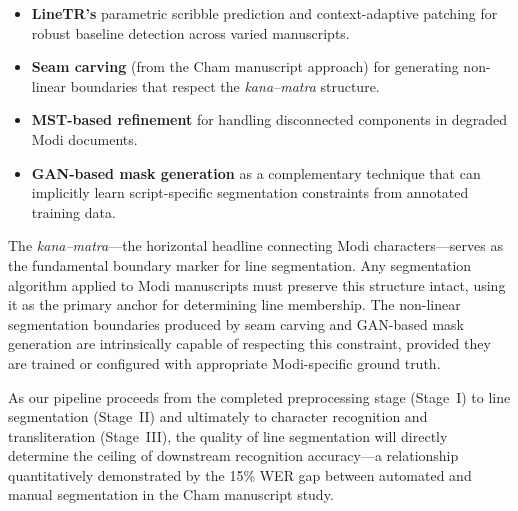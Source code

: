 \documentclass[11pt, a4paper]{article}
\begin{document}
\begin{itemize}[leftmargin=1.5em]
    \item \textbf{LineTR's} parametric scribble prediction and context-adaptive patching for robust baseline detection across varied manuscripts.
    \item \textbf{Seam carving} (from the Cham manuscript approach) for generating non-linear boundaries that respect the \textit{kana--matra} structure.
    \item \textbf{MST-based refinement} for handling disconnected components in degraded Modi documents.
    \item \textbf{GAN-based mask generation} as a complementary technique that can implicitly learn script-specific segmentation constraints from annotated training data.
\end{itemize}

The \textit{kana--matra}---the horizontal headline connecting Modi characters---serves as the fundamental boundary marker for line segmentation. Any segmentation algorithm applied to Modi manuscripts must preserve this structure intact, using it as the primary anchor for determining line membership. The non-linear segmentation boundaries produced by seam carving and GAN-based mask generation are intrinsically capable of respecting this constraint, provided they are trained or configured with appropriate Modi-specific ground truth.

As our pipeline proceeds from the completed preprocessing stage (Stage~I) to line segmentation (Stage~II) and ultimately to character recognition and transliteration (Stage~III), the quality of line segmentation will directly determine the ceiling of downstream recognition accuracy---a relationship quantitatively demonstrated by the 15\% WER gap between automated and manual segmentation in the Cham manuscript study.
\end{document}
